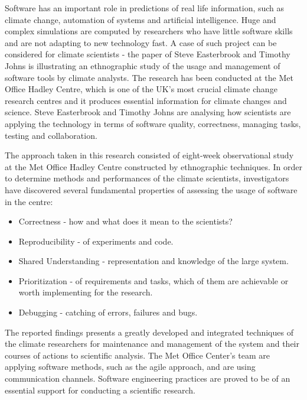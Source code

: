 Software has an important role in predictions of real life information, such as climate change, automation of systems and artificial intelligence. \cite{easterbrook2009engineering}\cite{chasmSoftware} Huge and complex simulations are computed by researchers who have little software skills and are not adapting to new technology fast. A case of such project can be considered for climate scientists - the paper of Steve Easterbrook and Timothy Johns \cite{easterbrook2009engineering} is illustrating an ethnographic study of the usage and management of software tools by climate analysts. The research has been conducted at the Met Office Hadley Centre, which 
is one of the UK's most crucial climate change research centres and it produces essential information for climate changes and science. \cite{metOffice} Steve Easterbrook and Timothy Johns \cite{easterbrook2009engineering} are analysing how scientists are applying the technology in terms of software quality, correctness, managing tasks, testing and collaboration. 

The approach taken in this research consisted of eight-week observational study at the
Met Office Hadley Centre constructed by ethnographic techniques. In order to determine methods and performances of the climate scientists, investigators have discovered several fundamental properties of assessing the usage of software in the centre:\cite{easterbrook2009engineering}

\begin{itemize}
\item Correctness - how and what does it mean to the scientists? 
\item Reproducibility - of experiments and code. 
\item Shared Understanding - representation and knowledge of the large system. 
\item Prioritization - of requirements and tasks, which of them are achievable or worth implementing for the research. 
\item Debugging - catching of errors, failures and bugs.
\end{itemize}

The reported findings presents a greatly developed and integrated techniques of the climate researchers for maintenance and management of the system and their courses of actions to scientific analysis. The Met Office Center's team are applying software methods, such as the agile approach, and are using communication channels. Software engineering practices are proved to be of an essential support for conducting a scientific research. 

